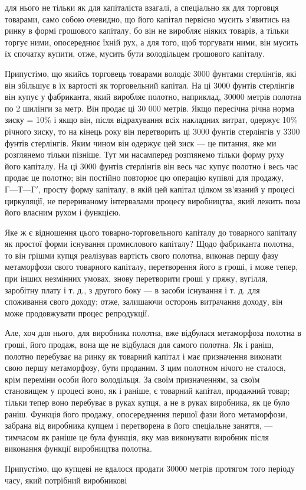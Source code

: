 \parcont{}  %
для нього не тільки як для капіталіста взагалі, а спеціально як
для торговця товарами, само собою очевидно, що його капітал
первісно мусить з’явитись на ринку в формі грошового капіталу,
бо він не виробляє ніяких товарів, а тільки торгує ними, опосереднює їхній рух, а для того, щоб
торгувати ними, він мусить
їх спочатку купити, отже, мусить бути володільцем грошового
капіталу.

Припустімо, що якийсь торговець товарами володіє 3000 фунтами стерлінгів, які він збільшує в їх
вартості як торговельний
капітал. На ці 3000 фунтів стерлінгів він купує у фабриканта,
який виробляє полотно, наприклад, 30000 метрів полотна по
2 шилінги за метр. Він продає ці 30 000 метрів. Якщо пересічна
річна норма зиску = 10\% і якщо він, після відрахування всіх
накладних витрат, одержує 10\% річного зиску, то на кінець року
він перетворить ці 3000 фунтів стерлінгів у 3300 фунтів стерлінгів. Яким чином він одержує цей зиск
— це питання, яке ми
розглянемо тільки пізніше. Тут ми насамперед розглянемо тільки
форму руху його капіталу. На ці 3000 фунтів стерлінгів він
весь час купує полотно і весь час продає це полотно; він постійно повторює цю операцію купівлі для
продажу, $Г — Т — Г'$,
просту форму капіталу, в якій цей капітал цілком зв’язаний у процесі циркуляції, не перериваному
інтервалами процесу виробництва, який лежить поза його власним рухом і функцією.

Яке ж є відношення цього товарно-торговельного капіталу
до товарного капіталу як простої форми існування промислового
капіталу? Щодо фабриканта полотна, то він грішми купця реалізував вартість свого полотна, виконав
першу фазу метаморфози свого товарного капіталу, перетворення його в гроші, і може
тепер, при інших незмінних умовах, знову перетворити гроші
у пряжу, вугілля, заробітну плату і т. д., з другого боку — в засоби існування і т. д. для
споживання свого доходу; отже, залишаючи осторонь витрачання доходу, він може продовжувати процес
репродукції.

Але, хоч для нього, для виробника полотна, вже відбулася
метаморфоза полотна в гроші, його продаж, вона ще не відбулася для самого полотна. Як і раніш,
полотно перебуває на ринку
як товарний капітал і має призначення виконати свою першу
метаморфозу, бути проданим. З цим полотном нічого не сталося,
крім переміни особи його володільця. За своїм призначенням, за
своїм становищем у процесі воно, як і раніше, є товарний капітал, продажний товар; тільки тепер воно
перебуває в руках
купця, а не в руках виробника, як це було раніш. Функція його
продажу, опосереднення першої фази його метаморфози, забрана
від виробника купцем і перетворена в його спеціальне заняття, — тимчасом як раніше це була функція,
яку мав виконувати виробник після виконання функції виробництва полотна.

Припустімо, що купцеві не вдалося продати 30000 метрів
протягом того періоду часу, який потрібний виробникові
\parbreak{}  %
